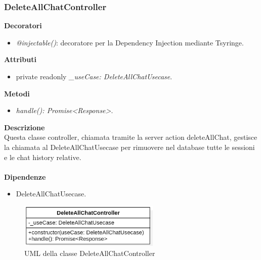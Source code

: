 \subsubsection{DeleteAllChatController}
\textbf{Decoratori}
\begin{itemize}
    \item \textit{@injectable()}: decoratore per la Dependency Injection mediante Tsyringe.
\end{itemize}
\textbf{Attributi}
\begin{itemize}
    \item private readonly \textit{\_useCase: DeleteAllChatUsecase}.
\end{itemize}
\textbf{Metodi}
\begin{itemize}
    \item \textit{handle(): Promise<Response>}.
\end{itemize}
\textbf{Descrizione}\\
Questa classe controller, chiamata tramite la server action deleteAllChat, gestisce la chiamata al DeleteAllChatUsecase per rimuovere nel database tutte le sessioni e le chat history relative.\\ \\
\textbf{Dipendenze}
\begin{itemize}
    \item DeleteAllChatUsecase.
\end{itemize}

\begin{figure}[h!]
    \centering  
    \includegraphics[width=0.6\textwidth]{DeleteAllChatController.png}
    \caption{UML della classe DeleteAllChatController}
\end{figure}

